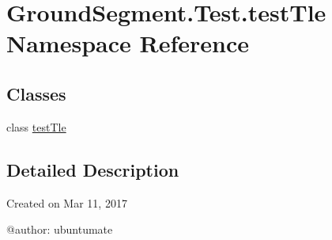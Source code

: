 \hypertarget{namespace_ground_segment_1_1_test_1_1test_tle}{}\section{Ground\+Segment.\+Test.\+test\+Tle Namespace Reference}
\label{namespace_ground_segment_1_1_test_1_1test_tle}
\subsection*{Classes}
\begin{DoxyCompactItemize}
\item 
class \hyperlink{class_ground_segment_1_1_test_1_1test_tle_1_1test_tle}{test\+Tle}
\end{DoxyCompactItemize}


\subsection{Detailed Description}
\begin{DoxyVerb}Created on Mar 11, 2017

@author: ubuntumate
\end{DoxyVerb}
 